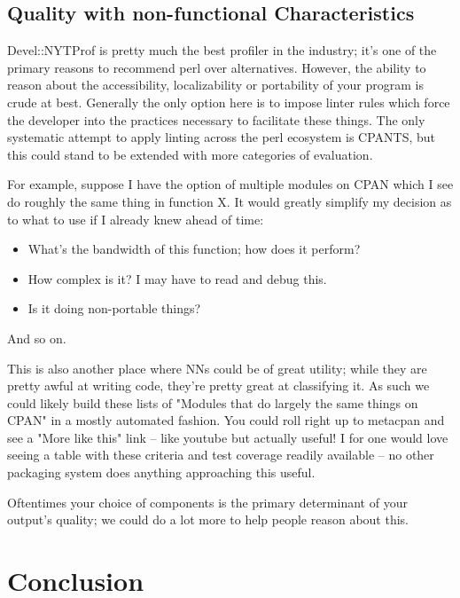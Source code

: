 \documentclass{article}
\begin{document}
\subsection{Quality with non-functional Characteristics}

Devel::NYTProf is pretty much the best profiler in the industry; it's one of the primary reasons to recommend perl over alternatives.
However, the ability to reason about the accessibility, localizability or portability of your program is crude at best.
Generally the only option here is to impose linter rules which force the developer into the practices necessary to facilitate these things.
The only systematic attempt to apply linting across the perl ecosystem is CPANTS, but this could stand to be extended with more categories of evaluation.

For example, suppose I have the option of multiple modules on CPAN which I see do roughly the same thing in function X.
It would greatly simplify my decision as to what to use if I already knew ahead of time:
\begin{itemize}
\item What's the bandwidth of this function; how does it perform?
\item How complex is it?  I may have to read and debug this.
\item Is it doing non-portable things?
\end{itemize}
And so on.

This is also another place where NNs could be of great utility; while they are pretty awful at writing code, they're pretty great at classifying it.
As such we could likely build these lists of "Modules that do largely the same things on CPAN" in a mostly automated fashion.
You could roll right up to metacpan and see a "More like this" link -- like youtube but actually useful!
I for one would love seeing a table with these criteria and test coverage readily available -- no other packaging system does anything approaching this useful.

Oftentimes your choice of components is the primary determinant of your output's quality; we could do a lot more to help people reason about this.

\newpage
\section{Conclusion}
\end{document}
